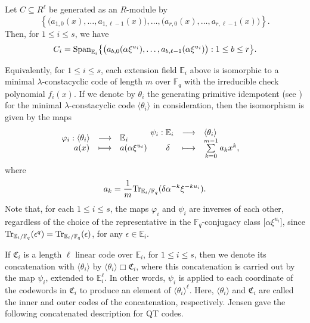 \documentclass[11pt]{amsart}
\theoremstyle{plain}
\theoremstyle{definition}
\numberwithin{equation}{section}
\newcommand{\Fq}{\mathbb{F}_{q}}
\newcommand{\E}{\mathbb{E}}
\newcommand{\F}{{\mathbb F}}
\newcommand{\Tr}{{\rm Tr}}
\newcommand{\Span}{{\rm Span}}
\begin{document}
Let $C\subseteq R^\ell$ be generated as an $R$-module by
\[
\left\{\bigl(a_{1,0}(x),\ldots ,a_{1,\ell-1}(x)\bigr),\ldots,\bigl(a_{r,0}(x),\ldots ,a_{r,\ell-1}(x)\bigr)\right\}.
\]
Then, for $1\leq i \leq s$, we have
\begin{equation}\label{explicit constituents}
 C_i  = \Span_{\E_i}\bigl\{\bigl(a_{b,0}(\alpha\xi^{u_i}),\ldots, a_{b,\ell-1}(\alpha\xi^{u_i})\bigr): 1\leq b \leq r \bigr\}.   
\end{equation}

Equivalently, for $1\leq i \leq s$, each extension field $\E_i$ above is isomorphic to a minimal $\lambda$-constacyclic code of length $m$ over $\F_q$ with the irreducible check polynomial $f_i(x)$. If we denote by $\theta_i$ the generating primitive idempotent (see \cite[Theorem 1]{LG}) for the minimal $\lambda$-constacyclic code $\langle \theta_i \rangle$ in consideration, then the isomorphism is given by the maps
\begin{eqnarray} \label{isoms}\hspace{-10pt}
\begin{array}{ccl} \varphi_i:\langle \theta_i \rangle
& \longrightarrow & \E_i \\ \hspace{0.5cm} a(x)& \longmapsto &
a(\alpha\xi^{u_i}) \end{array}
&\hspace{-16pt} & \begin{array}{ccl} \psi_i: \E_i & \longrightarrow & \langle \theta_i \rangle \\
\hspace{0.5cm} \delta & \longmapsto & \sum\limits_{k=0}^{m-1} a_kx^k,
\end{array}
\end{eqnarray}
where
$$a_k=\frac{1}{m} \Tr_{\E_i/\F_q}(\delta\alpha^{-k}\xi^{-ku_i}).\vspace{8pt}$$
Note that, for each $1\leq i\leq s$, the maps $\varphi_i$ and $\psi_i$ are inverses of each other, regardless of the choice of the representative in the $\Fq$-conjugacy class $\big[\alpha\xi^{u_i}\big]$, since $\Tr_{\E_i/\F_q}(\epsilon^q)=\Tr_{\E_i/\F_q}(\epsilon)$, for any $\epsilon\in\E_i$.

If $\mathfrak{C}_i$ is a length $\ell$ linear code over $\E_i$, for $1\leq i \leq s$, then we denote its concatenation with $\langle \theta_i \rangle$ by $\langle \theta_i \rangle \Box \mathfrak{C}_i$, where this concatenation is carried out by the map $\psi_i$, extended to $\E_i^\ell$. In other words, $\psi_i$ is applied to each coordinate of the codewords in $\mathfrak{C}_i$ to produce an element of $\langle \theta_i\rangle ^\ell$. Here, $\langle \theta_i \rangle$ and $\mathfrak{C}_i$ are called the inner and outer codes of the concatenation, respectively. Jensen gave the following concatenated description for QT codes.
\end{document}

